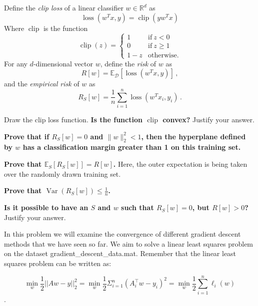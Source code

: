 Define the \emph{clip loss} of a linear classifier $w\in \mathbb{R}^d$ as
\[
	\operatorname{loss}(w^T x,y) = \operatorname{clip}(y w^T x)
\]
Where $\operatorname{clip}$ is the function
\[
\operatorname{clip}(z) = \begin{cases} 1 & \mbox{if}~z <0\\
		0 & \mbox{if}~z \geq 1\\
				1-z & \mbox{otherwise.}
		\end{cases}
\]
For any $d$-dimensional vector $w$, define the \emph{risk} of $w$ as
\[
	R[w] = \mathbb{E}_\mathcal{D}[\operatorname{loss}(w^T x,y)]\,,
\]
and the \emph{empirical risk} of $w$ as
\[
	R_S[w] = \frac{1}{n} \sum_{i=1}^n \operatorname{loss}(w^T x_i,y_i)\,.
\]

\begin{Parts}

\Part Draw the clip loss function. \textbf{Is the function $\operatorname{clip}$ convex?} Justify your answer.






\Part \textbf{Prove that if $R_S[w]=0$ and $\|w\|^2_2 < 1$, then the
  hyperplane defined by $w$ has a classification margin greater than 1 on this
  training set.} 



\Part \textbf{Prove that $\mathbb{E}_S[R_S[w]] = R[w]$.} Here, the
outer expectation is being taken over the randomly drawn training
set. 



\Part \textbf{Prove that $\operatorname{Var} (R_S[w]) \leq
  \frac{1}{n}$.} 



\Part \textbf{Is it possible to have an $S$ and $w$ such that $R_S[w]=0$, but $R[w]>0$?}  Justify your answer.



\end{Parts}

In this problem we will examine the convergence of different gradient
descent methods that we have seen so far. We aim to solve a linear
least squares problem on the dataset gradient\_descent\_data.mat. Remember that the linear least squares problem can be written as:

$$\min_w \frac{1}{2} || Aw - y||^2_2 = \min_w \frac{1}{2} \Sigma_{i=1}^n (A_i^\top w - y_i)^2 = \min_w \frac{1}{2} \sum_{i=1}^n \ell_i(w)$$.

